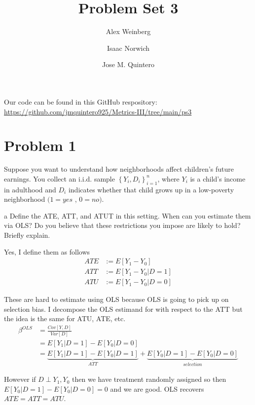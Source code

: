 \documentclass{article}
\title{Problem Set 3}
\author{Alex Weinberg \and Isaac Norwich \and Jose M. Quintero}
\begin{document}
\maketitle

Our code can be found in this GitHub respository: \url{https://github.com/jmquintero925/Metrics-III/tree/main/ps3}



\section*{Problem 1}
Suppose you want to understand how neighborhoods affect children's
future earnings. You collect an i.i.d. sample $\left\{ Y_{i},D_{i}\right\} _{i=1}^{n}$,
where $Y_{i}$ is a child's income in adulthood and $D_{i}$ indicates
whether that child grows up in a low-poverty neighborhood $(1=yes$
, $0=no)$. 

\begin{problem}{a}
Define the ATE, ATT, and ATUT in this setting. When can you estimate
them via OLS? Do you believe that these restrictions you impose are
likely to hold? Briefly explain. 
\end{problem}

Yes, I define them as follows
\begin{align*}
ATE & :=E\left[Y_{1}-Y_{0}\right]\\
ATT & :=E\left[Y_{1}-Y_{0}|D=1\right]\\
ATU & :=E\left[Y_{1}-Y_{0}|D=0\right]
\end{align*}

These are hard to estimate using OLS because OLS is going to pick
up on selection bias. I decompose the OLS estimand for with respect
to the ATT but the idea is the same for ATU, ATE, etc. 
\begin{align*}
\beta^{OLS} & =\frac{Cov\left[Y,D\right]}{Var\left[D\right]}\\
 & =E\left[Y_{1}|D=1\right]-E\left[Y_{0}|D=0\right]\\
 & =\underbrace{E\left[Y_{1}|D=1\right]-E\left[Y_{0}|D=1\right]}_{ATT}+\underbrace{E\left[Y_{0}|D=1\right]-E\left[Y_{0}|D=0\right]}_{selection}
\end{align*}

However if $D\perp Y_{1},Y_{0}$ then we have treatment randomly assigned
so then $E\left[Y_{0}|D=1\right]-E\left[Y_{0}|D=0\right]=0$ and we
are good. OLS recovers $ATE=ATT=ATU$.
\end{document}
